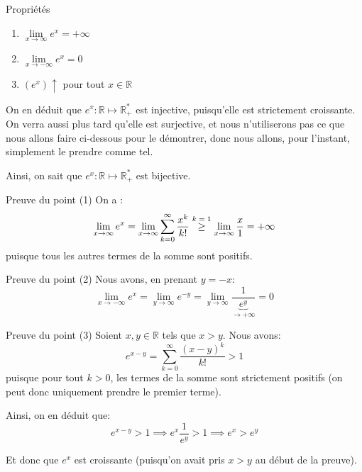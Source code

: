 \documentclass[a4paper]{article}
\begin{document}
\begin{parag}{Propriétés}
    \begin{enumerate}[left=0pt]
        \item $\lim\limits_{x \to \infty} e^x = +\infty$
        \item $\lim\limits_{x \to -\infty} e^x = 0$
        \item $\left(e^x\right)\uparrow$ pour tout $x \in \mathbb{R}$
    \end{enumerate}
   
    On en déduit que $e^{x} : \mathbb{R} \mapsto \mathbb{R}^*_+$ est injective, puisqu'elle est strictement croissante. On verra aussi plus tard qu'elle est surjective, et nous n'utiliserons pas ce que nous allons faire ci-dessous pour le démontrer, donc nous allons, pour l'instant, simplement le prendre comme tel. 

    Ainsi, on sait que $e^x : \mathbb{R} \mapsto \mathbb{R}^*_+$ est bijective.
    
    \begin{subparag}{Preuve du point (1)}
        On a : 
        \[\lim_{x \to \infty} e^x = \lim_{x \to \infty} \sum_{k=0}^{\infty} \frac{x^k}{k!} \over{\geq}{$k=1$}  \lim_{x \to \infty} \frac{x}{1} = +\infty\]
        puisque tous les autres termes de la somme sont positifs.
    \end{subparag}

    \begin{subparag}{Preuve du point (2)}
        Nous avons, en prenant $y = -x$:
        \[\lim_{x \to -\infty} e^x = \lim_{y \to \infty} e^{-y} = \lim_{y \to \infty} \frac{1}{\underbrace{e^y}_{\to +\infty}} = 0\]
    \end{subparag}

    \begin{subparag}{Preuve du point (3)}
        Soient $x,y \in \mathbb{R}$ tels que $x > y$. Nous avons: 
        \[e^{x - y} = \sum_{k=0}^{\infty} \frac{\left(x-y\right)^k}{k!} > 1\]
        puisque pour tout $k > 0$, les termes de la somme sont strictement positifs (on peut donc uniquement prendre le premier terme). 

        Ainsi, on en déduit que: 
        \[e^{x - y} > 1 \implies e^{x} \frac{1}{e^{y}} > 1 \implies e^x > e^y\]
        
        Et donc que $e^x$ est croissante (puisqu'on avait pris $x > y$ au début de la preuve).
    \end{subparag}
    
    
\end{parag}
\end{document}
